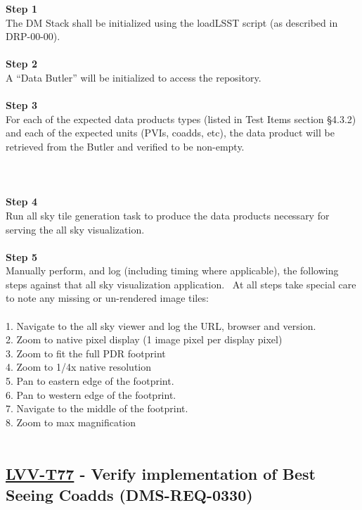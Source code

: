 \textbf{Step 1}\\
The DM Stack shall be initialized using the loadLSST script (as
described in DRP-00-00).\\
~\\
\textbf{Step 2}\\
A ``Data Butler'' will be initialized to access the repository.\\
~\\
\textbf{Step 3}\\
For each of the expected data products types (listed in Test Items
section §4.3.2) and each of the expected units (PVIs, coadds, etc), the
data product will be retrieved from the Butler and verified to be
non-empty.\\
~\\
~\\
~\\
\textbf{Step 4}\\
Run all sky tile generation task to produce the data products necessary
for serving the all sky visualization.\\
~\\
\textbf{Step 5}\\
Manually perform, and log (including timing where applicable), the
following steps against that all sky visualization application. ~At all
steps take special care to note any missing or un-rendered image
tiles:\\
~\\
1. Navigate to the all sky viewer and log the URL, browser and
version.\\
2. Zoom to native pixel display (1 image pixel per display pixel)\\
3. Zoom to fit the full PDR footprint\\
4. Zoom to 1/4x native resolution\\
5. Pan to eastern edge of the footprint.\\
6. Pan to western edge of the footprint.\\
7. Navigate to the middle of the footprint.\\
8. Zoom to max magnification\\
~\\

\hypertarget{lvv-t77---verify-implementation-of-best-seeing-coadds-dms-req-0330}{%
\subsection{\texorpdfstring{\href{https://jira.lsstcorp.org/secure/Tests.jspa\#/testCase/LVV-T77}{LVV-T77}
- Verify implementation of Best Seeing Coadds
(DMS-REQ-0330)}{LVV-T77 - Verify implementation of Best Seeing Coadds (DMS-REQ-0330)}}\label{lvv-t77---verify-implementation-of-best-seeing-coadds-dms-req-0330}}

